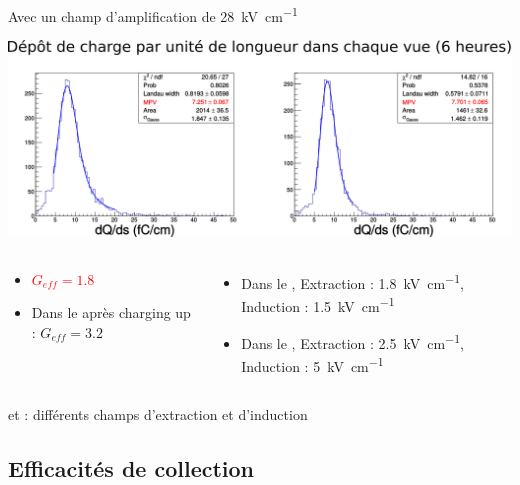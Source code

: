     \begin{frame}{Avec un champ d'amplification de \SI{28}{\kilo\volt\per\centi\meter}}
        \begin{scriptsize}
            \includegraphics[width=\textwidth]{./pictures/dQds_840.png}\\
            \begin{columns}[t]
                \begin{column}{0.5\textwidth}
                    \begin{itemize}
                        \item \textcolor{red}{$G_{eff}=1.8$}
                        \item Dans le \threeL{} après charging up : $G_{eff}=3.2$
                    \end{itemize}
                \end{column}
                \begin{column}{0.5\textwidth}
                    \begin{itemize}
                        \item Dans le \TOO{}, Extraction : \SI{1.8}{\kilo\volt\per\centi\meter}, Induction : \SI{1.5}{\kilo\volt\per\centi\meter}
                        \item Dans le \threeL{}, Extraction : \SI{2.5}{\kilo\volt\per\centi\meter}, Induction : \SI{5}{\kilo\volt\per\centi\meter}
                    \end{itemize}
                \end{column}
            \end{columns}
            \vfill
            \TOO{} et \threeL{} : différents champs d'extraction et d'induction\\
        \end{scriptsize}
    \end{frame}

    \subsection[Efficacités de collection]{Efficacités de collection}

